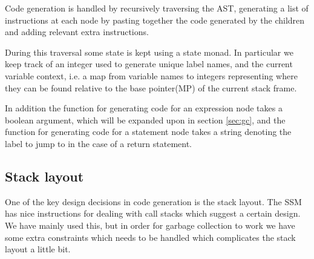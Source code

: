 \documentclass{scrartcl}
\begin{document}
Code generation is handled by recursively traversing the AST, generating
a list of instructions at each node by pasting together the code
generated by the children and adding relevant extra instructions.

During this traversal some state is kept using a state monad. In
particular we keep track of an integer used to generate unique label
names, and the current variable context, i.e. a map
from variable names to integers representing where they can be found
relative to the base pointer(MP) of the current stack frame.

In addition the function for generating code for an expression node
takes a boolean argument, which will be expanded upon in section
\ref{sec:gc}, and the function for generating code for a statement
node takes a string denoting the label to jump to in the case of a 
return statement.

\subsection{Stack layout}
One of the key design decisions in code generation is the stack
layout. The SSM has nice instructions for dealing with call stacks
which suggest a certain design. We have mainly used this, but in
order for garbage collection to work we have some extra constraints 
which needs to be handled which complicates the stack layout a little
bit.
\end{document}
